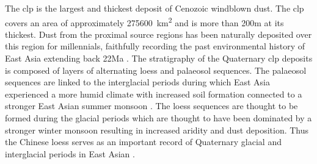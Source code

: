 \thispagestyle{plain}
The \acrfull{clp} is the largest and thickest deposit of Cenozoic windblown dust. The \acrshort{clp} covers an area of approximately \SI{275600}{\kilo\metre\squared} and is more than 200\si{\metre} at its thickest. Dust from the proximal source regions has been naturally deposited over this region for millennials, faithfully recording the past environmental history of East Asia extending back 22Ma . The stratigraphy of the Quaternary \acrshort{clp} deposits is composed of layers of alternating loess and palaeosol sequences. The palaeosol sequences are linked to the interglacial periods during which East Asia experienced a more humid climate with increased soil formation connected to a stronger East Asian summer monsoon . The loess sequences are thought to be formed during the glacial periods which are thought to have been dominated by a stronger winter monsoon resulting in increased aridity and dust deposition. Thus the Chinese loess serves as an important record of Quaternary glacial and interglacial periods in East Asian .

